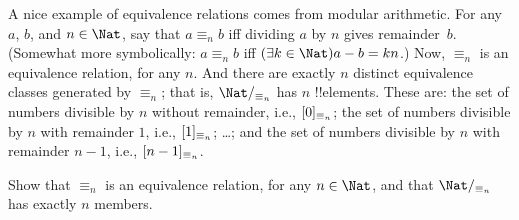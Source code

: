 \documentclass[../../../include/open-logic-section]{subfiles}
\begin{document}
\begin{ex}
A nice example of equivalence relations comes from modular arithmetic.
For any $a$, $b$, and $n \in \Nat$, say that $a \equiv_n b$ iff
dividing $a$ by $n$ gives remainder~$b$. (Somewhat more symbolically:
$a \equiv_n b$ iff $(\exists k \in \Nat)a - b = kn$.) Now, $\equiv_n$
is an equivalence relation, for any $n$. And there are exactly $n$
distinct equivalence classes generated by $\equiv_n$; that is,
$\equivclass{\Nat}{\equiv_n}$ has $n$ !!{element}s. These are: the set
of numbers divisible by $n$ without remainder, i.e.,
$[0]_{\equiv_n}$; the set of numbers divisible by $n$ with
remainder $1$, i.e., $[1]_{\equiv_n}$; \ldots; and the set of
numbers divisible by $n$ with remainder $n-1$, i.e.,
$[n-1]_{\equiv_n}$. 
\end{ex}

\begin{prob}
Show that $\equiv_n$ is an equivalence relation, for any $n \in
\Nat$, and that $\equivclass{\Nat}{\equiv_n}$ has exactly $n$ members.
\end{prob}
\end{document}
